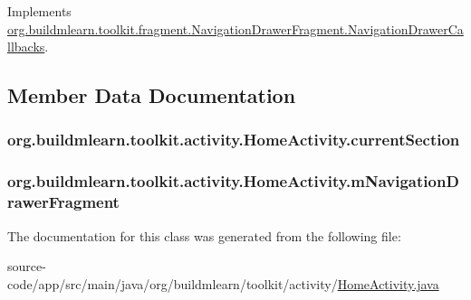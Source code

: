 Implements \hyperlink{interfaceorg_1_1buildmlearn_1_1toolkit_1_1fragment_1_1NavigationDrawerFragment_1_1NavigationDrawerCallbacks_a6068a4dec53d00ec47c222f995064e6c}{org.\+buildmlearn.\+toolkit.\+fragment.\+Navigation\+Drawer\+Fragment.\+Navigation\+Drawer\+Callbacks}.



\subsection{Member Data Documentation}
\subsubsection[{\texorpdfstring{current\+Section}{currentSection}}]{ org.\+buildmlearn.\+toolkit.\+activity.\+Home\+Activity.\+current\+Section\hspace{0.3cm}{\ttfamily [private]}}\hypertarget{classorg_1_1buildmlearn_1_1toolkit_1_1activity_1_1HomeActivity_ab4c37abd0b73d06bcb29ff53cc0d894c}{}\label{classorg_1_1buildmlearn_1_1toolkit_1_1activity_1_1HomeActivity_ab4c37abd0b73d06bcb29ff53cc0d894c}
\subsubsection[{\texorpdfstring{m\+Navigation\+Drawer\+Fragment}{mNavigationDrawerFragment}}]{ org.\+buildmlearn.\+toolkit.\+activity.\+Home\+Activity.\+m\+Navigation\+Drawer\+Fragment\hspace{0.3cm}{\ttfamily [private]}}\hypertarget{classorg_1_1buildmlearn_1_1toolkit_1_1activity_1_1HomeActivity_a96725cb6e809c106369d5622bdafba9a}{}\label{classorg_1_1buildmlearn_1_1toolkit_1_1activity_1_1HomeActivity_a96725cb6e809c106369d5622bdafba9a}


The documentation for this class was generated from the following file\+:\begin{DoxyCompactItemize}
\item 
source-\/code/app/src/main/java/org/buildmlearn/toolkit/activity/\hyperlink{HomeActivity_8java}{Home\+Activity.\+java}\end{DoxyCompactItemize}
